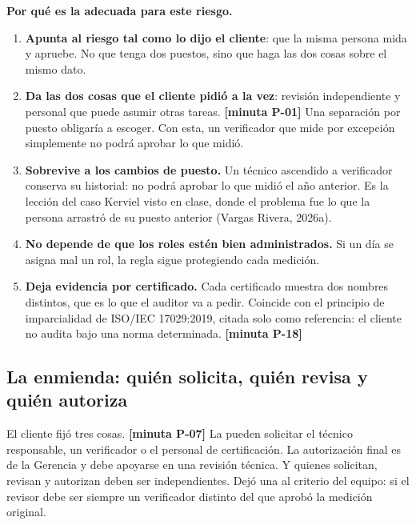 \documentclass[11pt,letterpaper]{article}
\newcommand{\resp}[1]{\textrm{\footnotesize\bfseries [minuta #1]}}
\begin{document}
\textbf{Por qué es la adecuada para este riesgo.}

\begin{enumerate}
\item \textbf{Apunta al riesgo tal como lo dijo el cliente}: que la misma persona mida y apruebe. No que
      tenga dos puestos, sino que haga las dos cosas sobre el mismo dato.
\item \textbf{Da las dos cosas que el cliente pidió a la vez}: revisión independiente y personal que
      puede asumir otras tareas. \resp{P-01} Una separación por puesto obligaría a escoger. Con esta,
      un verificador que mide por excepción simplemente no podrá aprobar lo que midió.
\item \textbf{Sobrevive a los cambios de puesto.} Un técnico ascendido a verificador conserva su
      historial: no podrá aprobar lo que midió el año anterior. Es la lección del caso Kerviel visto
      en clase, donde el problema fue lo que la persona arrastró de su puesto anterior (Vargas Rivera,
      2026a).
\item \textbf{No depende de que los roles estén bien administrados.} Si un día se asigna mal un rol, la
      regla sigue protegiendo cada medición.
\item \textbf{Deja evidencia por certificado.} Cada certificado muestra dos nombres distintos, que es lo
      que el auditor va a pedir. Coincide con el principio de imparcialidad de ISO/IEC 17029:2019,
      citada solo como referencia: el cliente no audita bajo una norma determinada. \resp{P-18}
\end{enumerate}

\subsection{La enmienda: quién solicita, quién revisa y quién autoriza}
\label{sec:enmienda}

El cliente fijó tres cosas. \resp{P-07} La pueden solicitar el técnico responsable, un verificador o
el personal de certificación. La autorización final es de la Gerencia y debe apoyarse en una revisión
técnica. Y quienes solicitan, revisan y autorizan deben ser independientes. Dejó una al criterio del
equipo: si el revisor debe ser siempre un verificador distinto del que aprobó la medición original.
\end{document}
